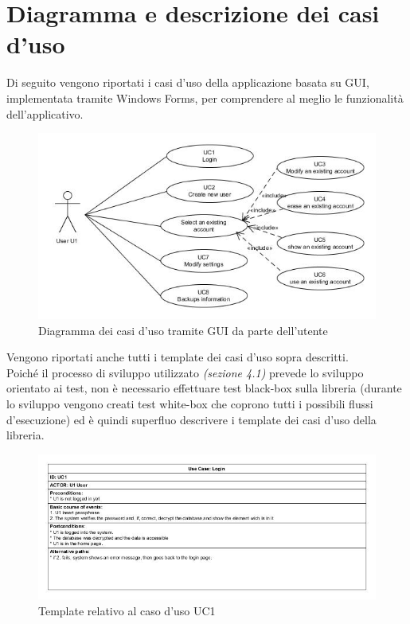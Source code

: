 \documentclass[a4paper,10pt]{report}
\begin{document}
  \section{Diagramma e descrizione dei casi d'uso}
    Di seguito vengono riportati i casi d’uso della applicazione basata su GUI,
			implementata tramite Windows Forms, per comprendere al meglio le
			funzionalità dell’applicativo.\\
			\begin{figure}[!h]
				\centering
				\includegraphics[width = \textwidth]{immagini/USE_CASE_DIAGRAM-UMLet2.jpg}
				\caption{Diagramma dei casi d'uso tramite GUI da parte dell'utente}
				\end{figure}
			Vengono riportati anche tutti i template dei casi d'uso sopra descritti.\\
			Poiché il processo di sviluppo utilizzato {\itshape(sezione 4.1)}
			prevede lo sviluppo orientato ai test, non è necessario effettuare
			test black-box sulla libreria (durante lo sviluppo vengono creati test
			white-box che coprono tutti i possibili flussi d’esecuzione) ed è quindi
			superfluo descrivere i template dei casi d’uso della libreria.
			\begin{figure}[htbp]
				\centering
				\includegraphics[width = \textwidth]{immagini/USE_CASE_TEMPLATE/UC01.jpg}
				\caption{Template relativo al caso d'uso UC1}
				\end{figure}
\end{document}
